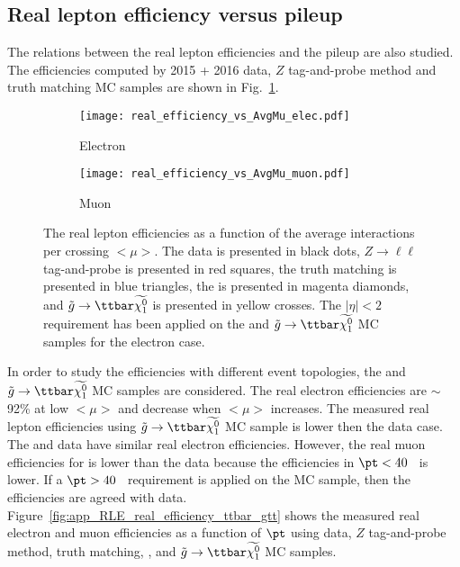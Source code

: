 \subsection{Real lepton efficiency versus pileup}
\label{subsec:app_RLE_vs_pileup}
The relations between the real lepton efficiencies and the pileup are also studied.
The efficiencies computed by 2015 + 2016 data, $Z$ tag-and-probe method and truth matching MC samples are shown in Fig.~\ref{fig:app_RLE_vs_pileup}.
%
\begin{figure}[htbp]
    \begin{subfigure}[b]{0.48\textwidth}
        \begin{center}
            \texttt{[image: real\_efficiency\_vs\_AvgMu\_elec.pdf]}
            \caption{Electron}
        \end{center}
    \end{subfigure}
    \begin{subfigure}[b]{0.48\textwidth}
        \begin{center}
            \texttt{[image: real\_efficiency\_vs\_AvgMu\_muon.pdf]}
            \caption{Muon}
        \end{center}
    \end{subfigure}
    \caption{The real lepton efficiencies as a function of the average interactions per crossing $<\mu>$.
    The data is presented in black dots,  $Z\to \ell\ell$ tag-and-probe is presented in red squares, the truth matching is presented in blue triangles, the \ttbar is presented in magenta diamonds, and $\tilde{g} \to \ttbar \widetilde{\chi^{0}_{1}}$ is presented in yellow crosses.
    The $|\eta|<2$ requirement has been applied on the \ttbar and $\tilde{g} \to \ttbar \widetilde{\chi^{0}_{1}}$ MC samples for the electron case.}
\label{fig:app_RLE_vs_pileup}
\end{figure}
%
In order to study the efficiencies with different event topologies, the \ttbar and $\tilde{g} \to \ttbar \widetilde{\chi^{0}_{1}}$ MC samples are considered.
The real electron efficiencies are $\sim$92\% at low $<\mu>$ and decrease when $<\mu>$ increases.
The measured real lepton efficiencies using $\tilde{g} \to \ttbar \widetilde{\chi^{0}_{1}}$ MC sample is lower then the data case.
The \ttbar and data have similar real electron efficiencies.
However, the real muon efficiencies for \ttbar is lower than the data because the efficiencies in $\pt < 40$~{\GeV} is lower.
If a $\pt > 40$~{\GeV} requirement is applied on the \ttbar MC sample, then the efficiencies are agreed with data.
Figure~\ref{fig:app_RLE_real_efficiency_ttbar_gtt} shows the measured real electron and muon efficiencies as a function of $\pt$ using data, $Z$ tag-and-probe method, truth matching, \ttbar, and $\tilde{g} \to \ttbar \widetilde{\chi^{0}_{1}}$ MC samples.
